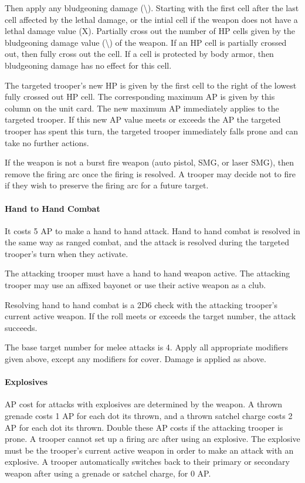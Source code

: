 Then apply any bludgeoning damage (\textbackslash).
Starting with the first cell after the last cell affected by the lethal damage, or the intial cell if the weapon does not have a lethal damage value (X).
Partially cross out the number of HP cells given by the bludgeoning damage value (\textbackslash) of the weapon.
If an HP cell is partially crossed out, then fully cross out the cell.
If a cell is protected by body armor, then bludgeoning damage has no effect for this cell.

The targeted trooper's new HP is given by the first cell to the right of the lowest fully crossed out HP cell.
The corresponding maximum AP is given by this column on the unit card.
The new maximum AP immediately applies to the targeted trooper.
If this new AP value meets or exceeds the AP the targeted trooper has spent this turn, the targeted trooper immediately falls prone and can take no further actions.

If the weapon is not a burst fire weapon (auto pistol, SMG, or laser SMG), then remove the firing arc once the firing is resolved.
A trooper may decide not to fire if they wish to preserve the firing arc for a future target.

\paragraph*{Hand to Hand Combat}

It costs 5 AP to make a hand to hand attack.
Hand to hand combat is resolved in the same way as ranged combat, and the attack is resolved during the targeted trooper's turn when they activate.

The attacking trooper must have a hand to hand weapon active.
The attacking trooper may use an affixed bayonet or use their active weapon as a club.

Resolving hand to hand combat is a 2D6 check with the attacking trooper's current active weapon.
If the roll meets or exceeds the target number, the attack succeeds.

The base target number for melee attacks is 4.
Apply all appropriate modifiers given above, except any modifiers for cover.
Damage is applied as above.

\paragraph*{Explosives}

AP cost for attacks with explosives are determined by the weapon.
A thrown grenade costs 1 AP for each dot its thrown, and a thrown satchel charge costs 2 AP for each dot its thrown.
Double these AP costs if the attacking trooper is prone.
A trooper cannot set up a firing arc after using an explosive.
The explosive must be the trooper's current active weapon in order to make an attack with an explosive.
A trooper automatically switches back to their primary or secondary weapon after using a grenade or satchel charge, for 0 AP.

